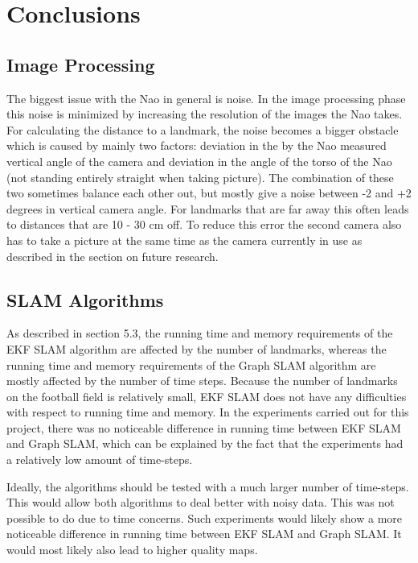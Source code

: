 \documentclass{ba-kecs}
\numberwithin{figure}{section}
\numberwithin{equation}{section}
\begin{document}
\section{Conclusions}
\subsection{Image Processing}
The biggest issue with the Nao in general is noise. In the image processing phase this noise is minimized by increasing the resolution of the images the Nao takes. For calculating the distance to a landmark, the noise becomes a bigger obstacle which is caused by mainly two factors: deviation in the by the Nao measured vertical angle of the camera and deviation in the angle of the torso of the Nao (not standing entirely straight when taking picture).
The combination of these two sometimes balance each other out, but mostly give a noise between -2 and +2 degrees in vertical camera angle. For landmarks that are far away this often leads to distances that are 10 - 30 cm off. To reduce this error the second camera also has to take a picture at the same time as the camera currently in use as described in the section on future research. 

\subsection{SLAM Algorithms}
As described in section 5.3, the running time and memory requirements of the EKF SLAM algorithm are affected by the number of landmarks, whereas the running time and memory requirements of the Graph SLAM algorithm are mostly affected by the number of time steps. Because the number of landmarks on the football field is relatively small, EKF SLAM does not have any difficulties with respect to running time and memory. In the experiments carried out for this project, there was no noticeable difference in running time between EKF SLAM and Graph SLAM, which can be explained by the fact that the experiments had a relatively low amount of time-steps.

Ideally, the algorithms should be tested with a much larger number of time-steps. This would allow both algorithms to deal better with noisy data. This was not possible to do due to time concerns. Such experiments would likely show a more noticeable difference in running time between EKF SLAM and Graph SLAM. It would most likely also lead to higher quality maps.


\end{document}
